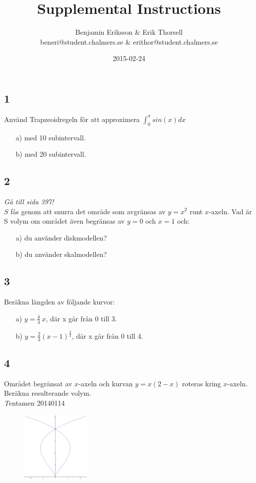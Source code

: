 \documentclass{article}
\title{Supplemental Instructions}
\author{Benjamin Eriksson \& Erik Thorsell \\ 
		\small{beneri@student.chalmers.se} \&
		\small{erithor@student.chalmers.se}
}
\date{
      2015-02-24
     }
\begin{document}
\maketitle
\subsection*{1}
Använd Trapzeoidregeln för att approximera $\int_0^{\pi} sin(x) dx$
\begin{itemize}
    \item[a) ] med 10 subintervall.
    \item[b) ] med 20 subintervall.
\end{itemize}   

\subsection*{2}
{\it Gå till sida 397!}\\
$S$ fås genom att snurra det område som avgränsas av $y = x^2$ 
runt $x$-axeln. Vad är S volym om området även begränsas av $y = 0$ och 
$x = 1$ och: 
\begin{itemize}
    \item[a) ] du använder diskmodellen?
    \item[b) ] du använder skalmodellen?
\end{itemize}

\subsection*{3}
Beräkna längden av följande kurvor: \\
\begin{itemize}
	\item[a) ] $y = \frac{4}{3} \> x$, där x går från 0 till 3.
	\item[b) ] $y = \frac{2}{3} (x-1)^{ \frac{3}{2} }$, där x går från 0 till 4. 
\end{itemize}





\subsection*{4}
Området begränsat av $x$-axeln och kurvan $y=x(2-x)$ roteras kring $x$-axeln. 
Beräkna resulterande volym.\\
{\emph Tentamen 20140114}

\begin{figure}
  \begin{center}
    \includegraphics[width=0.3\textwidth]{curve}
  \end{center}
\end{figure}
\end{document}
